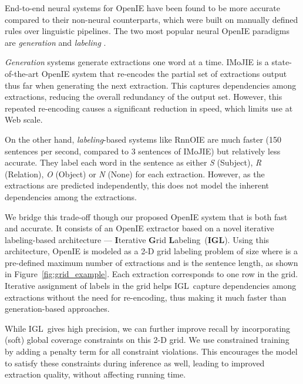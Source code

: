 \documentclass[11pt,a4paper]{article}
\newcommand{\shortname}{{\scshape IGL}}
\newcommand{\boldlongname}{\textbf{I}terative \textbf{G}rid \textbf{L}abeling}
\newcommand{\boldshortname}{{\textbf{IGL}}}
\begin{document}
End-to-end neural systems for OpenIE have been found to be more accurate compared to their non-neural counterparts, which were built on manually defined rules over linguistic pipelines. The two most popular neural OpenIE paradigms are \emph{generation} \citep{cui+18, kolluru&al20} and \emph{labeling} \citep{stanovsky&al18, roy&al19}. 


\emph{Generation} systems generate extractions one word at a time. IMoJIE \cite{kolluru&al20} is a state-of-the-art OpenIE system that re-encodes the partial set of extractions output thus far when generating the next extraction. This captures dependencies among extractions, reducing the overall redundancy of the output set. However, this repeated re-encoding causes a significant reduction in speed, which limits use at Web scale.



On the other hand, \emph{labeling}-based systems like RnnOIE \cite{stanovsky&al15} are much faster (150 sentences per second, compared to 3 sentences of IMoJIE) but relatively less accurate. They label each word in the sentence as either \textit{S} (Subject), \textit{R} (Relation), \textit{O} (Object) or \textit{N} (None) for each extraction. However, as the extractions are predicted independently, this does not model the inherent dependencies among the extractions.

We bridge this trade-off though our proposed OpenIE system that is both fast and accurate. It consists of an OpenIE extractor based on a novel iterative labeling-based architecture --- \boldlongname\ (\boldshortname). Using this architecture, OpenIE is modeled as a 2-D 
grid labeling problem of size  where  is a pre-defined maximum number of extractions and  is the sentence length, as shown in Figure~\ref{fig:grid_example}.
Each extraction corresponds to one row in the grid. Iterative assignment of labels in the grid helps \shortname\ capture dependencies among extractions without the need for re-encoding, thus making it much faster than generation-based approaches.


While \shortname\ gives high precision, we can further improve recall by incorporating (soft) global coverage constraints on this 2-D grid. We use constrained training \cite{mehta&al18} by adding a penalty term for all constraint violations. This encourages the model to satisfy these constraints during inference as well, leading to improved extraction quality, without affecting running time.
\end{document}
